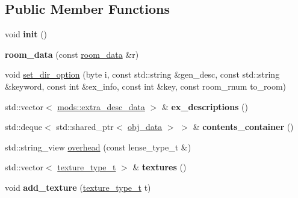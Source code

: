\subsection*{Public Member Functions}
\begin{DoxyCompactItemize}
\item 
\mbox{\label{structroom__data_afcd0aff11a5deaeacb1b0a9a0d6d8024}} 
void {\bfseries init} ()
\item 
\mbox{\label{structroom__data_a130bb038480d990dbf2f1ae8107767b3}} 
{\bfseries room\+\_\+data} (const \hyperlink{structroom__data}{room\+\_\+data} \&r)
\item 
void \hyperlink{structroom__data_a34bca78611d71d3aaffa3c3353bd14f9}{set\+\_\+dir\+\_\+option} (byte i, const std\+::string \&gen\+\_\+desc, const std\+::string \&keyword, const int \&ex\+\_\+info, const int \&key, const room\+\_\+rnum to\+\_\+room)
\item 
\mbox{\label{structroom__data_ab4f6133ecc1bd1d75ae511a151dba79a}} 
std\+::vector$<$ \hyperlink{structmods_1_1extra__desc__data}{mods\+::extra\+\_\+desc\+\_\+data} $>$ \& {\bfseries ex\+\_\+descriptions} ()
\item 
\mbox{\label{structroom__data_a426dcc56f86e2a6c6351cd10554e4d81}} 
std\+::deque$<$ std\+::shared\+\_\+ptr$<$ \hyperlink{structobj__data}{obj\+\_\+data} $>$ $>$ \& {\bfseries contents\+\_\+container} ()
\item 
std\+::string\+\_\+view \hyperlink{structroom__data_a2884a2a31feeab08c7e495453e354261}{overhead} (const lense\+\_\+type\+\_\+t \&)
\item 
\mbox{\label{structroom__data_ab43aed1d0b9a11454d53b53198f5d5e7}} 
std\+::vector$<$ \hyperlink{structroom__data_a9552b46091ee649079e41f04f9543b8e}{texture\+\_\+type\+\_\+t} $>$ \& {\bfseries textures} ()
\item 
\mbox{\label{structroom__data_acd1b6557b6eea95d4bc428d88f1bdd21}} 
void {\bfseries add\+\_\+texture} (\hyperlink{structroom__data_a9552b46091ee649079e41f04f9543b8e}{texture\+\_\+type\+\_\+t} t)
\item 
\mbox{\label{structroom__data_a34fdac45a93da5bcf158088dc6d66ae8}} 

\end{DoxyCompactItemize}
